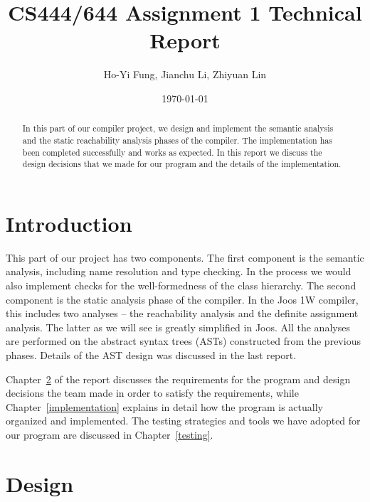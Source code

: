 \documentclass[a4paper, notitlepage]{report}
\title{CS444/644 Assignment 1 Technical Report}
\author{Ho-Yi Fung, Jianchu Li, Zhiyuan Lin}
\date{\today}
\begin{document}
{\let\newpage\relax\maketitle}

\vspace{30pt}
\begin{abstract}
In this part of our compiler project, we design and implement the semantic analysis and the static reachability analysis phases of the compiler. The implementation has been completed successfully and works as expected. In this report we discuss the design decisions that we made for our program and the details of the implementation.
\end{abstract}


\tableofcontents

\newpage

\chapter{Introduction}
This part of our project has two components. The first component is the semantic analysis, including name resolution and type checking. In the process we would also implement checks for the well-formedness of the class hierarchy. The second component is the static analysis phase of the compiler. In the Joos 1W compiler, this includes two analyses -- the reachability analysis and the definite assignment analysis. The latter as we will see is greatly simplified in Joos.  All the analyses are performed on the abstract syntax trees (ASTs) constructed from the previous phases. Details of the AST design was discussed in the last report.

Chapter~\ref{design} of the report discusses the requirements for the program and design decisions the team made in order to satisfy the requirements, while Chapter~\ref{implementation} explains in detail how the program is actually organized and implemented. The testing strategies and tools we have adopted for our program are discussed in Chapter~\ref{testing}.


\chapter{Design}
\label{design}
\end{document}
